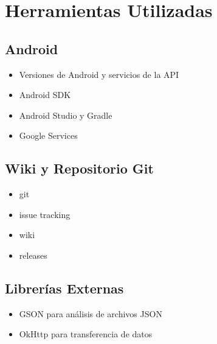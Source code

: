 \chapter{Herramientas Utilizadas}
\label{estrategia}

\section{Android}
\begin{itemize}
	\item Versiones de Android y servicios de la API
	\item Android SDK
	\item Android Studio y Gradle
	\item Google Services
\end{itemize}	

\section{Wiki y Repositorio Git}
\begin{itemize}
	\item git
	\item issue tracking 
	\item wiki
	\item releases
\end{itemize}	

\section{Librerías Externas}
\begin{itemize}
	\item GSON para análisis de archivos JSON
	\item OkHttp para transferencia de datos
\end{itemize}	



